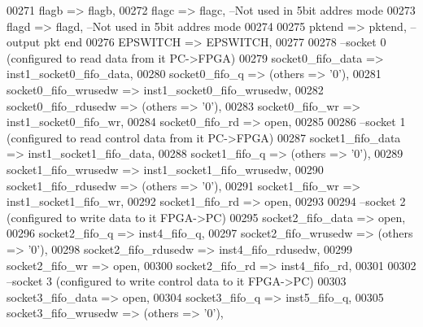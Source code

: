 \begin{DoxyCode}
00271         flagb                   => flagb,
00272       flagc                 => flagc,\textcolor{keyword}{                               --Not used in 5bit addres mode}
00273       flagd                 => flagd,\textcolor{keyword}{                               --Not used in 5bit addres mode}
00274 
00275         pktend              => pktend,\textcolor{keyword}{                              --output pkt end }
00276         EPSWITCH                    => EPSWITCH,
00277         
00278 \textcolor{keyword}{        --socket 0 (configured to read data from it PC->FPGA)}
00279         socket0_fifo_data           => inst1_socket0_fifo_data, 
00280         socket0_fifo_q              => \textcolor{vhdlchar}{(}\textcolor{keywordflow}{others} => '0'\textcolor{vhdlchar}{)}, 
00281         socket0_fifo_wrusedw        => inst1_socket0_fifo_wrusedw,
00282         socket0_fifo_rdusedw        => \textcolor{vhdlchar}{(}\textcolor{keywordflow}{others} => '0'\textcolor{vhdlchar}{)}, 
00283         socket0_fifo_wr         => inst1_socket0_fifo_wr,
00284         socket0_fifo_rd         => \textcolor{keywordflow}{open}, 
00285 
00286 \textcolor{keyword}{        --socket 1 (configured to read control data from it PC->FPGA)}
00287         socket1_fifo_data           => inst1_socket1_fifo_data,
00288         socket1_fifo_q              => \textcolor{vhdlchar}{(}\textcolor{keywordflow}{others} => '0'\textcolor{vhdlchar}{)},
00289         socket1_fifo_wrusedw        => inst1_socket1_fifo_wrusedw,
00290         socket1_fifo_rdusedw        => \textcolor{vhdlchar}{(}\textcolor{keywordflow}{others} => '0'\textcolor{vhdlchar}{)},
00291         socket1_fifo_wr         => inst1_socket1_fifo_wr,
00292         socket1_fifo_rd         => \textcolor{keywordflow}{open},
00293 
00294 \textcolor{keyword}{        --socket 2 (configured to write data to it FPGA->PC)}
00295         socket2_fifo_data           => \textcolor{keywordflow}{open}, 
00296         socket2_fifo_q              => inst4_fifo_q,
00297         socket2_fifo_wrusedw        => \textcolor{vhdlchar}{(}\textcolor{keywordflow}{others} => '0'\textcolor{vhdlchar}{)}, 
00298         socket2_fifo_rdusedw        => inst4_fifo_rdusedw,
00299         socket2_fifo_wr         => \textcolor{keywordflow}{open}, 
00300         socket2_fifo_rd         => inst4_fifo_rd,
00301 
00302 \textcolor{keyword}{        --socket 3 (configured to write control data to it FPGA->PC)}
00303         socket3_fifo_data           => \textcolor{keywordflow}{open}, 
00304         socket3_fifo_q              => inst5_fifo_q,
00305         socket3_fifo_wrusedw        => \textcolor{vhdlchar}{(}\textcolor{keywordflow}{others} => '0'\textcolor{vhdlchar}{)}, 

\end{DoxyCode}
